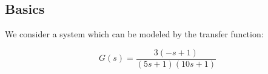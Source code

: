 \subsection{Basics}

We consider a system which can be modeled by the transfer function:

$$ G(s) = \frac{3(-s+1)}{(5s+1)(10s+1)} $$




